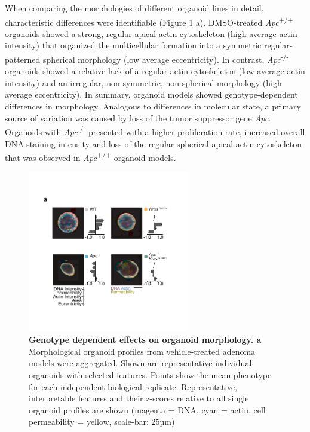 \begin{flushleft}
When comparing the morphologies of different organoid lines in detail, characteristic differences were identifiable (Figure \ref{fig_130} a). DMSO-treated \textit{Apc}\textsuperscript{+/+} organoids showed a strong, regular apical actin cytoskeleton (high average actin intensity) that organized the multicellular formation into a symmetric regular-patterned spherical morphology (low average eccentricity). In contrast, \textit{Apc}\textsuperscript{-/-}  organoids showed a relative lack of a regular actin cytoskeleton (low average actin intensity) and an irregular, non-symmetric, non-spherical morphology (high average eccentricity). In summary, organoid models showed genotype-dependent differences in morphology. Analogous to differences in molecular state, a primary source of variation was caused by loss of the tumor suppressor gene \textit{Apc}. Organoids with \textit{Apc}\textsuperscript{-/-} presented with a higher proliferation rate, increased overall DNA staining intensity and loss of the regular spherical apical actin cytoskeleton that was observed in \textit{Apc}\textsuperscript{+/+} organoid models.

\begin{figure}[h!]
\centering
\includegraphics[width=200pt,
                height=\textheight,
                keepaspectratio]{figures/adenomaprofiling/pdf/fig_1_3.pdf}
\caption[Genotype dependent effects on organoid morphology]{\textbf{Genotype dependent effects on organoid morphology. a}  Morphological organoid profiles from vehicle-treated adenoma models were aggregated. Shown are representative individual organoids with selected features. Points show the mean phenotype for each independent biological replicate. Representative, interpretable features and their z-scores relative to all single organoid profiles are shown (magenta = DNA, cyan = actin, cell permeability = yellow, scale-bar: 25µm)}
\label{fig_130}
\end{figure}
\bigbreak



\end{flushleft}
